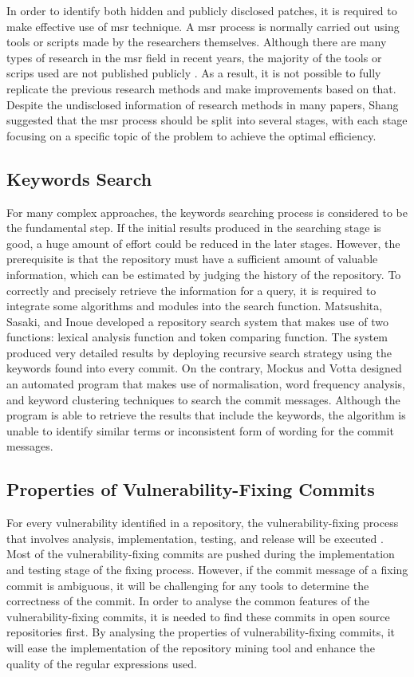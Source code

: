 \documentclass[12pt, a4paper]{report}
\begin{document}
In order to identify both hidden and publicly disclosed patches, it is required to make effective
use of \acrshort{msr} technique. A \acrshort{msr} process is normally carried out using tools or
scripts made by the researchers themselves. Although there are many types of research in the
\acrshort{msr} field in recent years, the majority of the tools or scrips used are not published
publicly \cite{robles_2010}. As a result, it is not possible to fully replicate the previous
research methods and make improvements based on that. Despite the undisclosed information of
research methods in many papers, Shang \cite{shang_2009} suggested that the \acrshort{msr} process
should be split into several stages, with each stage focusing on a specific topic of the problem to
achieve the optimal efficiency.

\subsection{Keywords Search}
For many complex approaches, the keywords searching process is considered to be the fundamental
step. If the initial results produced in the searching stage is good, a huge amount of effort could
be reduced in the later stages. However, the prerequisite is that the repository must have a
sufficient amount of valuable information, which can be estimated by judging the history of the
repository. To correctly and precisely retrieve the information for a query, it is required to
integrate some algorithms and modules into the search function. Matsushita, Sasaki, and Inoue
\cite{matsushita_2005} developed a repository search system that makes use of two functions: lexical
analysis function and token comparing function. The system produced very detailed results by
deploying recursive search strategy using the keywords found into every commit. On the contrary,
Mockus and Votta \cite{mockus_2000} designed an automated program that makes use of normalisation,
word frequency analysis, and keyword clustering techniques to search the commit messages. Although
the program is able to retrieve the results that include the keywords, the algorithm is unable to
identify similar terms or inconsistent form of wording for the commit messages.

\subsection{Properties of Vulnerability-Fixing Commits}
For every vulnerability identified in a repository, the vulnerability-fixing process that involves
analysis, implementation, testing, and release will be executed \cite{othmane_2015}. Most of the
vulnerability-fixing commits are pushed during the implementation and testing stage of the fixing
process. However, if the commit message of a fixing commit is ambiguous, it will be challenging for
any tools to determine the correctness of the commit. In order to analyse the common features of the
vulnerability-fixing commits, it is needed to find these commits in open source repositories first.
By analysing the properties of vulnerability-fixing commits, it will ease the implementation of the
repository mining tool and enhance the quality of the regular expressions used.
\end{document}
